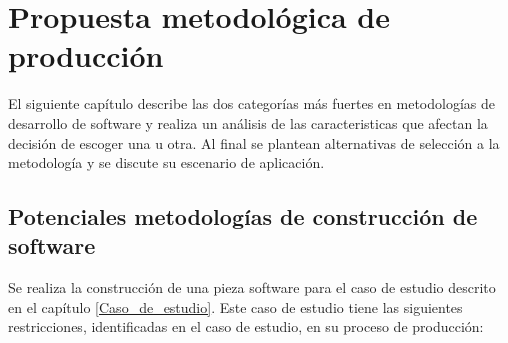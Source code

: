 
\chapter{Propuesta metodológica de producción}
\label{capitulometodologia}

El siguiente capítulo describe las dos categorías más fuertes en metodologías de desarrollo de software y realiza un análisis de las caracteristicas que afectan la decisión de escoger una u otra. Al final se plantean alternativas de selección a la metodología y se discute su escenario de aplicación.

\section{Potenciales metodologías de construcción de software}

Se realiza la construcción de una pieza software para el caso de estudio descrito en el capítulo \ref{Caso_de_estudio}. Este caso de estudio tiene las siguientes restricciones, identificadas en el caso de estudio, en su proceso de producción:

